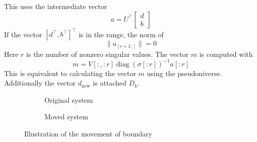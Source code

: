 \documentclass[doctype=mastersthesis,BCOR=15mm,biblatex]{ldvbook}%
\DeclareMathOperator{\diag}{diag}
\begin{document}
This uses the intermediate vector 
\begin{equation}
	a = U^\top 	
	\begin{bmatrix}
	d\\b
	\end{bmatrix}
\end{equation} 
If the vector $[d^\top,b^\top]^\top$ is in the range, the norm of 
\begin{equation}
	\|a_{[r+1:]} \| = 0
\end{equation}
Here $r$ is the number of nonzero singular values.
The vector $m$ is computed with 
\begin{equation}
	m = V[:,:r] \diag(\sigma[:r])^{-1} a[:r]
\end{equation}
This is equivalent to calculating the vector $m$ using the pseudoniverse.  
Additionally the vector $d_\text{new}$ is attached $D_k$.
\begin{figure}[htb]
	\centering
	
	\begin{subfigure}[b]{0.45\textwidth}
		\caption{Original system}
		\label{fig:move_right_a}
	\end{subfigure}
	\hspace{0.8cm}
	\begin{subfigure}[b]{0.45\textwidth}
		\caption{Moved system}
		\label{fig:move_right_b}
	\end{subfigure}
	\caption{Illustration of the movement of boundary}
	\label{fig:move_right}
\end{figure}
\end{document}
